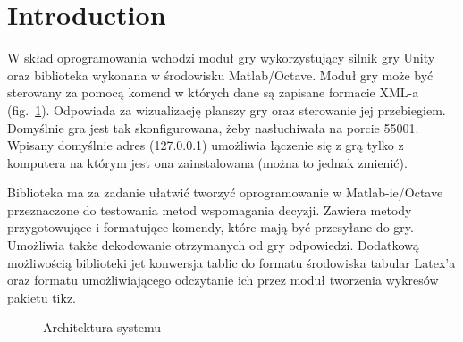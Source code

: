 
\section{Introduction}

W skład oprogramowania  \SoftwareName wchodzi moduł gry wykorzystujący silnik gry Unity oraz biblioteka wykonana w środowisku Matlab/Octave. Moduł gry może być sterowany za pomocą komend w których dane są zapisane formacie XML-a (fig.~\ref{Fig:architecture}). Odpowiada za wizualizację planszy gry oraz sterowanie jej przebiegiem. Domyślnie gra jest tak skonfigurowana, żeby nasłuchiwała na porcie 55001. Wpisany domyślnie adres (127.0.0.1) umożliwia łączenie się z grą tylko z komputera na którym jest ona zainstalowana (można to jednak zmienić).

 Biblioteka ma za zadanie ułatwić tworzyć oprogramowanie w Matlab-ie/Octave przeznaczone do testowania metod wspomagania decyzji.  Zawiera metody przygotowujące i formatujące komendy, które mają być przesyłane do gry. Umożliwia także dekodowanie otrzymanych od gry odpowiedzi. Dodatkową możliwością biblioteki jet konwersja tablic do formatu środowiska tabular Latex'a oraz formatu umożliwiającego odczytanie ich przez  moduł tworzenia wykresów pakietu tikz.

\begin{figure}

\caption{Architektura systemu}
\label{Fig:architecture}
\end{figure}